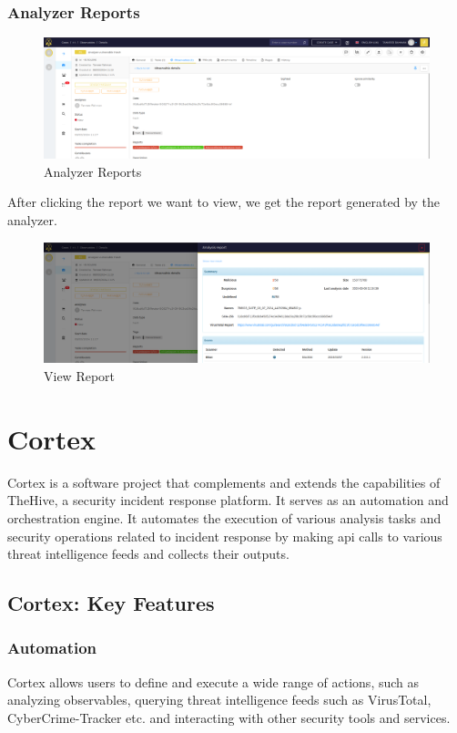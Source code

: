 \documentclass{book}
\begin{document}
\newpage
\subsection{Analyzer Reports}
\begin{figure}[h]
    \centering
    \includegraphics[width=.8\linewidth]{Case_images/Case Demo/analyzer reports.png}
    \caption{Analyzer Reports}
    \label{fig:analyzer_reports}
\end{figure}
\bigskip
After clicking the report we want to view, we get the report generated by the analyzer.
\begin{figure}[h]
    \centering
    \includegraphics[width=.8\linewidth]{Case_images/Case Demo/view_report.png}
    \caption{View Report}
    \label{fig:veiw_report}
\end{figure}


    


\chapter{Cortex}
Cortex is a software project that complements and extends the capabilities of
TheHive, a security incident response platform. It serves as an automation
and orchestration engine. It automates the execution of various analysis
tasks and security operations related to incident response by making api
calls to various threat intelligence feeds and collects their outputs.

\section{Cortex: Key Features}

\subsection{Automation}
Cortex allows users to define and execute a wide range
of actions, such as analyzing observables, querying threat intelligence
feeds such as VirusTotal, CyberCrime-Tracker etc. and interacting with
other security tools and services.
\end{document}
